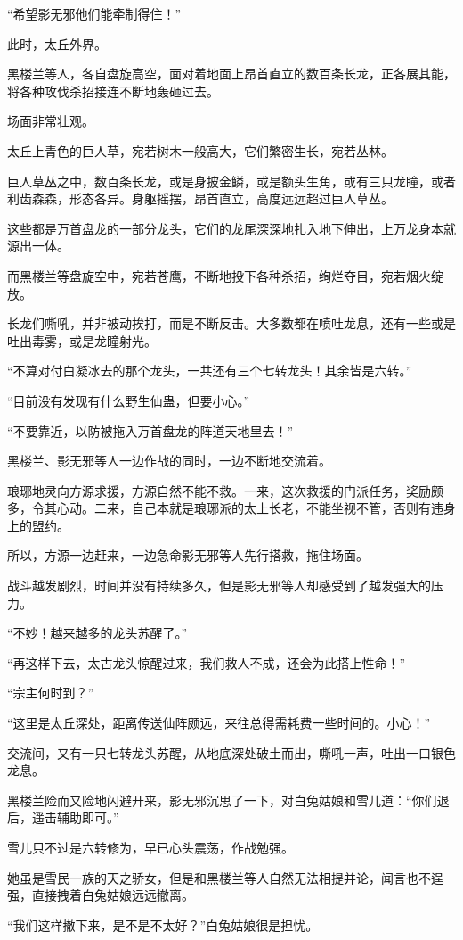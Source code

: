 \begin{this_body}
“希望影无邪他们能牵制得住！”

此时，太丘外界。

黑楼兰等人，各自盘旋高空，面对着地面上昂首直立的数百条长龙，正各展其能，将各种攻伐杀招接连不断地轰砸过去。

场面非常壮观。

太丘上青色的巨人草，宛若树木一般高大，它们繁密生长，宛若丛林。

巨人草丛之中，数百条长龙，或是身披金鳞，或是额头生角，或有三只龙瞳，或者利齿森森，形态各异。身躯摇摆，昂首直立，高度远远超过巨人草丛。

这些都是万首盘龙的一部分龙头，它们的龙尾深深地扎入地下伸出，上万龙身本就源出一体。

而黑楼兰等盘旋空中，宛若苍鹰，不断地投下各种杀招，绚烂夺目，宛若烟火绽放。

长龙们嘶吼，并非被动挨打，而是不断反击。大多数都在喷吐龙息，还有一些或是吐出毒雾，或是龙瞳射光。

“不算对付白凝冰去的那个龙头，一共还有三个七转龙头！其余皆是六转。”

“目前没有发现有什么野生仙蛊，但要小心。”

“不要靠近，以防被拖入万首盘龙的阵道天地里去！”

黑楼兰、影无邪等人一边作战的同时，一边不断地交流着。

琅琊地灵向方源求援，方源自然不能不救。一来，这次救援的门派任务，奖励颇多，令其心动。二来，自己本就是琅琊派的太上长老，不能坐视不管，否则有违身上的盟约。

所以，方源一边赶来，一边急命影无邪等人先行搭救，拖住场面。

战斗越发剧烈，时间并没有持续多久，但是影无邪等人却感受到了越发强大的压力。

“不妙！越来越多的龙头苏醒了。”

“再这样下去，太古龙头惊醒过来，我们救人不成，还会为此搭上性命！”

“宗主何时到？”

“这里是太丘深处，距离传送仙阵颇远，来往总得需耗费一些时间的。小心！”

交流间，又有一只七转龙头苏醒，从地底深处破土而出，嘶吼一声，吐出一口银色龙息。

黑楼兰险而又险地闪避开来，影无邪沉思了一下，对白兔姑娘和雪儿道：“你们退后，遥击辅助即可。”

雪儿只不过是六转修为，早已心头震荡，作战勉强。

她虽是雪民一族的天之骄女，但是和黑楼兰等人自然无法相提并论，闻言也不逞强，直接拽着白兔姑娘远远撤离。

“我们这样撤下来，是不是不太好？”白兔姑娘很是担忧。


\end{this_body}
